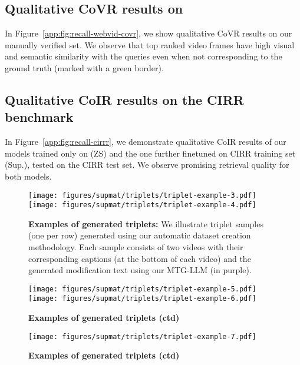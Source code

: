 \subsection{Qualitative CoVR results on \ourDSm}
\label{app:subsec:recall-webvid}
In Figure~\ref{app:fig:recall-webvid-covr}, we show qualitative CoVR results
on our manually verified \ourDSm set. We observe that top ranked
video frames have high visual and semantic similarity with the queries even
when not corresponding to the ground truth (marked with a green border).

\subsection{Qualitative CoIR results on the CIRR benchmark}
\label{app:subsec:recall-cirr}
In Figure~\ref{app:fig:recall-cirrr}, we demonstrate qualitative CoIR results
of our models trained only on \ourDS (ZS) and the one further finetuned on CIRR training set (Sup.),
tested on the CIRR {test set. We observe promising retrieval quality for both models.}


\begin{figure}\centering
  \texttt{[image: figures/supmat/triplets/triplet-example-3.pdf]}
  \texttt{[image: figures/supmat/triplets/triplet-example-4.pdf]}
  \caption{\textbf{Examples of generated triplets:} 
  {We illustrate triplet samples (one per row) generated using our automatic dataset creation methodology. 
  Each sample consists of two videos with their corresponding captions (at the bottom of each video)
  and the generated modification text using our MTG-LLM (in purple).}
  }
  \label{app:fig:triplet-12}
\end{figure}

\begin{figure}\centering
  \texttt{[image: figures/supmat/triplets/triplet-example-5.pdf]}
  \texttt{[image: figures/supmat/triplets/triplet-example-6.pdf]}
  \caption{\textbf{Examples of generated triplets (ctd)} 
  }
  \label{app:fig:triplet-34}
\end{figure}

\begin{figure}\centering
  \texttt{[image: figures/supmat/triplets/triplet-example-7.pdf]}
  \caption{\textbf{Examples of generated triplets (ctd)} 
  }
  \label{app:fig:triplet-5}
\end{figure}

